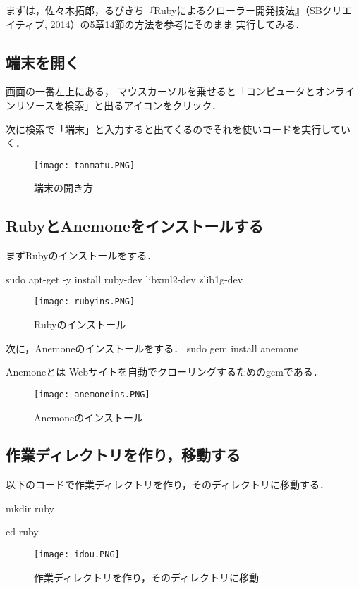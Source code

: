 まずは，佐々木拓郎，るびきち『Rubyによるクローラー開発技法』（SBクリエイティブ, 2014）の5章14節の方法を参考にそのまま
実行してみる．

\subsection{端末を開く}

画面の一番左上にある，
マウスカーソルを乗せると「コンピュータとオンラインリソースを検索」と出るアイコンをクリック．

次に検索で「端末」と入力すると出てくるのでそれを使いコードを実行していく．
\begin{figure}[H]
\centering
\texttt{[image: tanmatu.PNG]}
\caption{端末の開き方}\label{サンプル図}
\end{figure}


\subsection{RubyとAnemoneをインストールする}

まずRubyのインストールをする．

sudo apt-get -y install ruby-dev libxml2-dev zlib1g-dev

\begin{figure}[H]
\centering
\texttt{[image: rubyins.PNG]}
\caption{Rubyのインストール}\label{サンプル図}
\end{figure}


次に，Anemoneのインストールをする．
sudo gem install anemone

Anemoneとは
Webサイトを自動でクローリングするためのgemである．


\begin{figure}[H]
\centering
\texttt{[image: anemoneins.PNG]}
\caption{Anemoneのインストール}\label{サンプル図}
\end{figure}




\subsection{作業ディレクトリを作り，移動する}

以下のコードで作業ディレクトリを作り，そのディレクトリに移動する．

mkdir ruby



cd ruby


\begin{figure}[H]
\centering
\texttt{[image: idou.PNG]}
\caption{作業ディレクトリを作り，そのディレクトリに移動}\label{サンプル図}
\end{figure}

